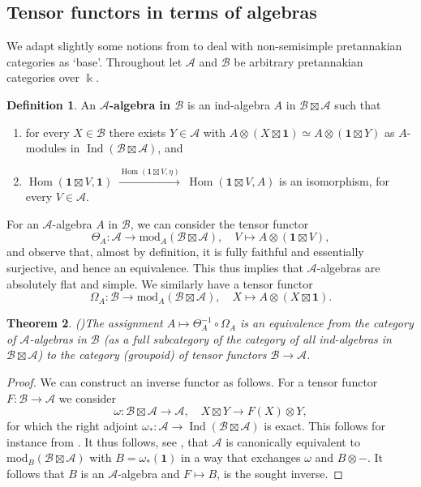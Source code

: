 \documentclass[11pt]{amsart}
\def\Ind{\operatorname{Ind}}
\def\Hom{\operatorname{Hom}}
\def\cA{\mathscr{A}}
\def\bk{\Bbbk}
\def\mod{\mathrm{ mod}}
\def\cB{\mathscr{B}}
\newtheorem{thm}{Theorem}[section]
\theoremstyle{definition}
\newtheorem{definition}[thm]{Definition}
\theoremstyle{remark}
\numberwithin{equation}{section}
\newcommand{\unit}{\mathbf{1}}
\begin{document}
\subsection{Tensor functors in terms of algebras}
We adapt slightly some notions from \cite[\S 3.3]{Duke} to deal with non-semisimple pretannakian categories as `base'. Throughout let $\cA$ and $\cB$ be arbitrary pretannakian categories over $\bk$.

\begin{definition}\label{def:Aalg}
    An {\bf $\cA$-algebra in $\cB$} is an ind-algebra $A$ in $\cB\boxtimes\cA$ such that
    \begin{enumerate}
        \item for every $X\in\cB$ there exists $Y\in\cA$ with $A\otimes (X\boxtimes\unit)\simeq A\otimes (\unit\boxtimes Y)$ as $A$-modules in $\Ind(\cB\boxtimes\cA)$, and
        \item $\Hom(\unit\boxtimes V,\unit)\;\xrightarrow{\Hom(\unit\boxtimes V,\eta)}\;\Hom(\unit\boxtimes V, A)$
    is an isomorphism, for every $V\in\cA$.
    \end{enumerate}
  
    
\end{definition}

For an $\cA$-algebra $A$ in $\cB$, we can consider the tensor functor
$$\Theta_A:\cA\to\mod_A(\cB\boxtimes\cA),\quad V\mapsto A\otimes(\unit\boxtimes V),$$
and observe that, almost by definition, it is fully faithful and essentially surjective, and hence an equivalence. This thus implies that $\cA$-algebras are absolutely flat and simple. We similarly have a tensor functor
$$\Omega_A:\cB\to\mod_A(\cB\boxtimes\cA),\quad X\mapsto A\otimes(X\boxtimes\unit).$$
\begin{thm}(\cite[Theorem~3.4.3]{Duke})\label{Thm:AlgFun}
The assignment $A\mapsto \Theta^{-1}_A\circ \Omega_A$ is an equivalence from the category of $\cA$-algebras in $\cB$ (as a full subcategory of the category of all ind-algebras in $\cB\boxtimes\cA$) to the category (groupoid) of tensor functors $\cB\to\cA$.
\end{thm}


\begin{proof}
    We can construct an inverse functor as follows. For a tensor functor $F:\cB\to\cA$ we consider
    $$\omega: \cB\boxtimes\cA\to\cA, \quad X\boxtimes Y\to F(X)\otimes Y,$$
    for which the right adjoint $\omega_\ast:\cA\to\Ind(\cB\boxtimes\cA)$ is exact. This follows for instance from \cite[Proposition~8.22]{Del90}. It thus follows, see \cite[Lemma~6.2.1]{CEO}, that $\cA$ is canonically equivalent to $\mod_B(\cB\boxtimes\cA)$ with $B=\omega_\ast(\unit)$ in a way that exchanges $\omega$ and $B\otimes-$. It follows that $B$ is an $\cA$-algebra and $F\mapsto B$, is the sought inverse.
\end{proof}
\end{document}
